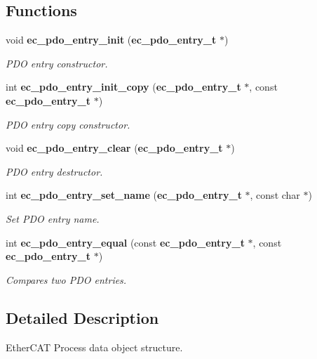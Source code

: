 \subsection*{Functions}
\begin{DoxyCompactItemize}
\item 
void {\bf ec\-\_\-pdo\-\_\-entry\-\_\-init} ({\bf ec\-\_\-pdo\-\_\-entry\-\_\-t} $\ast$)\label{pdo__entry_8h_a535f77bcfcff9801c4e15a0b80dc59f0}

\begin{DoxyCompactList}\small\item\em P\-D\-O entry constructor. \end{DoxyCompactList}\item 
int {\bf ec\-\_\-pdo\-\_\-entry\-\_\-init\-\_\-copy} ({\bf ec\-\_\-pdo\-\_\-entry\-\_\-t} $\ast$, const {\bf ec\-\_\-pdo\-\_\-entry\-\_\-t} $\ast$)
\begin{DoxyCompactList}\small\item\em P\-D\-O entry copy constructor. \end{DoxyCompactList}\item 
void {\bf ec\-\_\-pdo\-\_\-entry\-\_\-clear} ({\bf ec\-\_\-pdo\-\_\-entry\-\_\-t} $\ast$)\label{pdo__entry_8h_a71dbe7740b835cb199a93485b45de1ff}

\begin{DoxyCompactList}\small\item\em P\-D\-O entry destructor. \end{DoxyCompactList}\item 
int {\bf ec\-\_\-pdo\-\_\-entry\-\_\-set\-\_\-name} ({\bf ec\-\_\-pdo\-\_\-entry\-\_\-t} $\ast$, const char $\ast$)
\begin{DoxyCompactList}\small\item\em Set P\-D\-O entry name. \end{DoxyCompactList}\item 
int {\bf ec\-\_\-pdo\-\_\-entry\-\_\-equal} (const {\bf ec\-\_\-pdo\-\_\-entry\-\_\-t} $\ast$, const {\bf ec\-\_\-pdo\-\_\-entry\-\_\-t} $\ast$)
\begin{DoxyCompactList}\small\item\em Compares two P\-D\-O entries. \end{DoxyCompactList}\end{DoxyCompactItemize}


\subsection{Detailed Description}
Ether\-C\-A\-T Process data object structure. 

